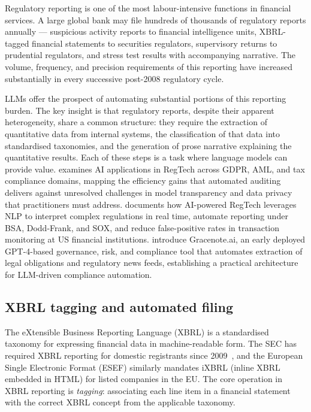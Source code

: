 \begin{context}
Regulatory reporting is one of the most labour-intensive functions in financial services. A large global bank may file hundreds of thousands of regulatory reports annually --- suspicious activity reports to financial intelligence units, XBRL-tagged financial statements to securities regulators, supervisory returns to prudential regulators, and stress test results with accompanying narrative. The volume, frequency, and precision requirements of this reporting have increased substantially in every successive post-2008 regulatory cycle.

LLMs offer the prospect of automating substantial portions of this reporting burden. The key insight is that regulatory reports, despite their apparent heterogeneity, share a common structure: they require the extraction of quantitative data from internal systems, the classification of that data into standardised taxonomies, and the generation of prose narrative explaining the quantitative results. Each of these steps is a task where language models can provide value. \citet{ViracachaP2024} examines AI applications in RegTech across GDPR, AML, and tax compliance domains, mapping the efficiency gains that automated auditing delivers against unresolved challenges in model transparency and data privacy that practitioners must address. \citet{Anand2025} documents how AI-powered RegTech leverages NLP to interpret complex regulations in real time, automate reporting under BSA, Dodd-Frank, and SOX, and reduce false-positive rates in transaction monitoring at US financial institutions. \citet{IoannidesEtAl2023} introduce Gracenote.ai, an early deployed GPT-4-based governance, risk, and compliance tool that automates extraction of legal obligations and regulatory news feeds, establishing a practical architecture for LLM-driven compliance automation.
\end{context}

\subsection{XBRL tagging and automated filing}
\label{sec:ch11-xbrl-tagging}

The eXtensible Business Reporting Language (XBRL) is a standardised taxonomy for expressing financial data in machine-readable form. The SEC has required XBRL reporting for domestic registrants since 2009~\cite{sec2009xbrl}, and the European Single Electronic Format (ESEF) similarly mandates iXBRL (inline XBRL embedded in HTML) for listed companies in the EU. The core operation in XBRL reporting is \emph{tagging}: associating each line item in a financial statement with the correct XBRL concept from the applicable taxonomy.

